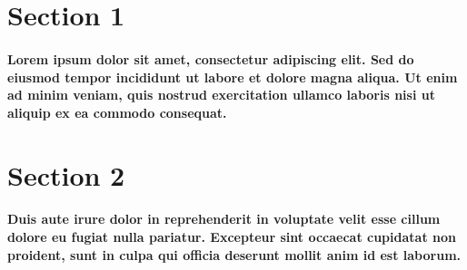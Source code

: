 \documentclass{article}
\begin{document}
\section{Section 1}
\paragraph{Lorem ipsum dolor sit amet, consectetur adipiscing elit. Sed do eiusmod tempor incididunt ut labore et dolore magna aliqua. Ut enim ad minim veniam, quis nostrud exercitation ullamco laboris nisi ut aliquip ex ea commodo consequat.
}
\section{Section 2}
\paragraph{Duis aute irure dolor in reprehenderit in voluptate velit esse cillum dolore eu fugiat nulla pariatur. Excepteur sint occaecat cupidatat non proident, sunt in culpa qui officia deserunt mollit anim id est laborum.
}
\end{document}
